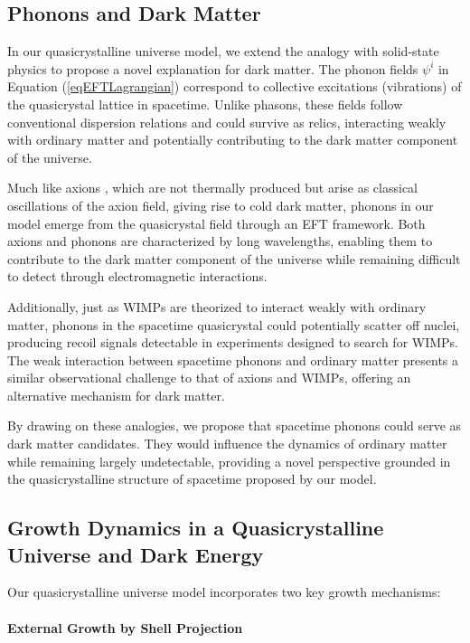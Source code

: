 \documentclass[sn-mathphys-num]{sn-jnl}%
\begin{document}
\subsection{Phonons and Dark Matter}

In our quasicrystalline universe model, we extend the analogy with solid-state physics to propose a novel explanation for dark matter. The phonon fields $\psi^i$ in Equation (\ref{eqEFTLagrangian}) correspond to collective excitations (vibrations) of the quasicrystal lattice in spacetime. Unlike phasons, these fields follow conventional dispersion relations and could survive as relics, interacting weakly with ordinary matter and potentially contributing to the dark matter component of the universe.

Much like axions \cite{Preskill, Abbott, Baggioli2021}, which are not thermally produced but arise as classical oscillations of the axion field, giving rise to cold dark matter, phonons in our model emerge from the quasicrystal field through an EFT framework. Both axions and phonons are characterized by long wavelengths, enabling them to contribute to the dark matter component of the universe while remaining difficult to detect through electromagnetic interactions.

Additionally, just as WIMPs are theorized to interact weakly with ordinary matter, phonons in the spacetime quasicrystal could potentially scatter off nuclei, producing recoil signals detectable in experiments designed to search for WIMPs. The weak interaction between spacetime phonons and ordinary matter presents a similar observational challenge to that of axions and WIMPs, offering an alternative mechanism for dark matter.

By drawing on these analogies, we propose that spacetime phonons could serve as dark matter candidates. They would influence the dynamics of ordinary matter while remaining largely undetectable, providing a novel perspective grounded in the quasicrystalline structure of spacetime proposed by our model.

\subsection{Growth Dynamics in a Quasicrystalline Universe and Dark Energy}

Our quasicrystalline universe model incorporates two key growth mechanisms:

\paragraph{External Growth by Shell Projection}
\end{document}
